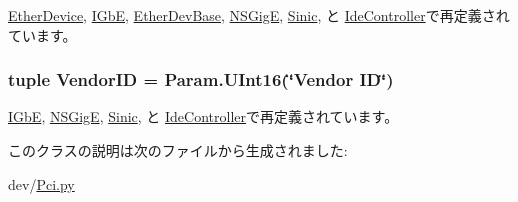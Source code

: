 \hyperlink{classEthernet_1_1EtherDevice_acce15679d830831b0bbe8ebc2a60b2ca}{EtherDevice}, \hyperlink{classEthernet_1_1IGbE_acce15679d830831b0bbe8ebc2a60b2ca}{IGbE}, \hyperlink{classEthernet_1_1EtherDevBase_acce15679d830831b0bbe8ebc2a60b2ca}{EtherDevBase}, \hyperlink{classEthernet_1_1NSGigE_acce15679d830831b0bbe8ebc2a60b2ca}{NSGigE}, \hyperlink{classEthernet_1_1Sinic_acce15679d830831b0bbe8ebc2a60b2ca}{Sinic}, と \hyperlink{classIde_1_1IdeController_acce15679d830831b0bbe8ebc2a60b2ca}{IdeController}で再定義されています。\hypertarget{classPci_1_1PciDevice_a48f611c5f9d4755971b7c867e4529cc6}{
\subsubsection[{VendorID}]{\setlength{\rightskip}{0pt plus 5cm}tuple {\bf VendorID} = Param.UInt16(\char`\"{}Vendor ID\char`\"{})}}
\label{classPci_1_1PciDevice_a48f611c5f9d4755971b7c867e4529cc6}


\hyperlink{classEthernet_1_1IGbE_a96ec1b4422f12f72160a0633ada47217}{IGbE}, \hyperlink{classEthernet_1_1NSGigE_a96ec1b4422f12f72160a0633ada47217}{NSGigE}, \hyperlink{classEthernet_1_1Sinic_a96ec1b4422f12f72160a0633ada47217}{Sinic}, と \hyperlink{classIde_1_1IdeController_a96ec1b4422f12f72160a0633ada47217}{IdeController}で再定義されています。

このクラスの説明は次のファイルから生成されました:\begin{DoxyCompactItemize}
\item 
dev/\hyperlink{Pci_8py}{Pci.py}\end{DoxyCompactItemize}
